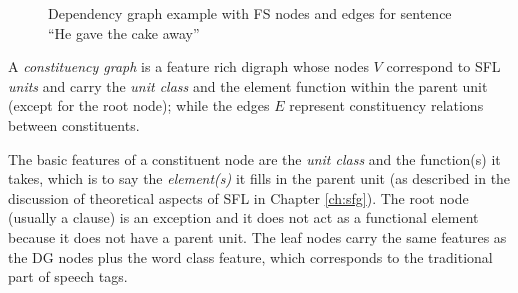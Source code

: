     \begin{figure}[!ht]
    \centering
    \caption{Dependency graph example with FS nodes and edges for sentence ``He gave the cake away''}
    \label{fig:dep-graph}
    \end{figure}


    \begin{definition}\label{def:constituency-graph}
    	A \textit{constituency graph} is a feature rich digraph whose nodes $V$ correspond to SFL \textit{units} and carry the \textit{unit class} and the element function within the parent unit (except for the root node); while the edges $E$ represent constituency relations between constituents. 
    \end{definition}

    The basic features of a constituent node are the \textit{unit class} and the function(s) it takes, which is to say the \textit{element(s)} it fills in the parent unit (as described in the discussion of theoretical aspects of SFL in Chapter \ref{ch:sfg}). The root node (usually a clause) is an exception and it does not act as a functional element because it does not have a parent unit. The leaf nodes carry the same features as the DG nodes plus the word class feature, which corresponds to the traditional part of speech tags. 


